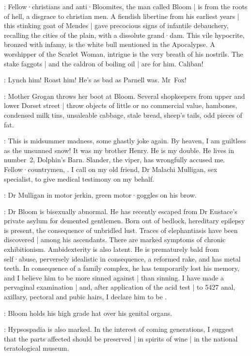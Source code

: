 \Dowie[1]:
Fellow·christians and anti·Bloomites,
the man called Bloom |
is from the roots of hell,
a disgrace to christian men.
A fiendish libertine from his earliest years |
this stinking goat of Mendes |
gave precocious signs of infantile debauchery,
recalling the cities of the plain,
with a dissolute grand·dam.
This vile hypocrite,
bronzed with infamy,
is the white bull mentioned in the Apocalypse.
A worshipper of the Scarlet Woman,
intrigue is the very breath of his nostrils.
The stake faggots |
and the caldron of boiling oil |
are for him.
Caliban!

\Mob[2]:
Lynch him!
Roast him!
He's as bad as Parnell was.
Mr~Fox!

:
Mother Grogan throws her boot at Bloom.
Several shopkeepers from upper and lower Dorset street |
throw objects of little or no commercial value,
hambones,
condensed milk tins,
unsaleable cabbage,
stale bread,
sheep's tails,
odd pieces of fat.

\Bloom:
This is midsummer madness,
some ghastly joke again.
By heaven,
I am guiltless as the unsunned snow!
It was my brother Henry.
He is my double.
He lives in number~2,
Dolphin's Barn.
Slander,
the viper,
has wrongfully accused me.
Fellow·countrymen,
.
I call on my old friend,
Dr Malachi Mulligan,
sex specialist,
to give medical testimony on my behalf.

:
Dr Mulligan in motor jerkin,
green motor·goggles on his brow.

\DrMulligan:
Dr Bloom is bisexually abnormal.
He has recently escaped from Dr Eustace's private asylum for demented gentlemen.
Born out of bedlock,
hereditary epilepsy is present,
the consequence of unbridled lust.
Traces of elephantiasis have been discovered |
among his ascendants.
There are marked symptoms of chronic exhibitionism.
Ambidexterity is also latent.
He is prematurely bald from self·abuse,
perversely idealistic in consequence,
a reformed rake,
and has metal teeth.
In consequence of a family complex,
he has temporarily lost his memory,
and I believe him to be more sinned against |
than sinning.
I have made a pervaginal examination |
and,
after application of the acid test |
to 5427 anal,
axillary,
pectoral and pubic hairs,
I declare him to be .

:
Bloom holds his high grade hat over his genital organs.

\DrMadden[2]:
Hypsospadia is also marked.
In the interest of coming generations,
I suggest that the parts affected should be preserved |
in spirits of wine |
in the national teratological museum.

